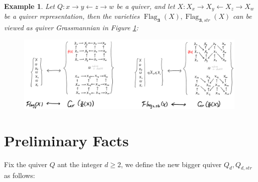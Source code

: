 \documentclass[reqno,11pt]{amsart}
\numberwithin{equation}{section}
\theoremstyle{plain}
\newtheorem{eg}[theorem]{Example}
\theoremstyle{plain}
\numberwithin{equation}{section}
\theoremstyle{remark}
\newcommand{\Flag}[1]{\operatorname{Flag}_{\mathbf{#1}}}
\newcommand{\Flagstr}[1]{\operatorname{Flag}_{\mathbf{#1},str}}
\begin{document}
\begin{eg}
Let $Q\colon x \longrightarrow y \longleftarrow z \longrightarrow w$ be a quiver, and let $X\colon X_x \longrightarrow X_y \longleftarrow X_z \longrightarrow X_w$ be a quiver representation, then the varieties $\Flag{3}(X),\Flagstr{3}(X)$ can be viewed as quiver Grassmannian in Figure \ref{fig:flagasgr}:

\begin{center}
	\begin{figure}[ht]\label{fig:flagasgr}
		\vspace{0cm}
		\centering
		\includegraphics[width=15cm]{figures/flagasgr.png}
		\caption{}
	\end{figure}
\end{center}


\end{eg}

\section{Preliminary Facts}\label{sec:flag=gr}
Fix the quiver $Q$ ant the integer $d \geqslant 2$, we define the new bigger quiver $Q_{d},Q_{d,str}$ as follows:
\end{document}

